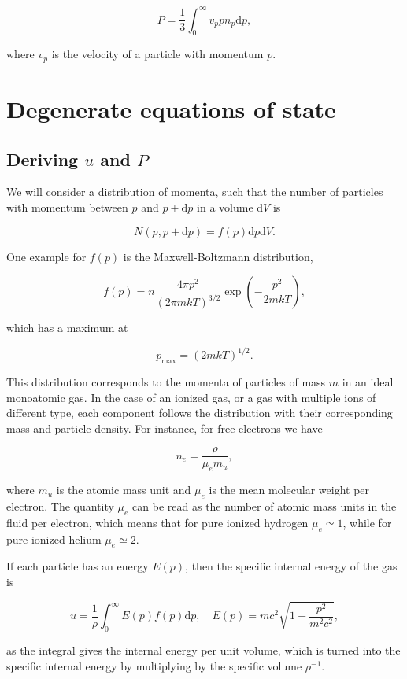 \documentclass[twocolumn]{article}
\begin{document}
\[P=\frac{1}{3}\int_0^\infty v_p p n_p\mathrm{d}p,\]

where \(v_p\) is the velocity of a particle with momentum \(p\).

\hypertarget{degenerate-equations-of-state}{%
\section{Degenerate equations of
state}\label{degenerate-equations-of-state}}

\hypertarget{deriving-u-and-p}{%
\subsection{\texorpdfstring{Deriving \(u\) and
\(P\)}{Deriving u and P}}\label{deriving-u-and-p}}

We will consider a distribution of momenta, such that the number of
particles with momentum between \(p\) and \(p+\mathrm{d}p\) in a volume
\(\mathrm{d}V\) is

\[N(p,p+\mathrm{d}p)=f(p)\mathrm{d}p\mathrm{d}V.\]

One example for \(f(p)\) is the Maxwell-Boltzmann distribution,

\[f(p)=\displaystyle n\frac{4\pi p^2}{(2\pi m k T)^{3/2}}\exp\left(-\frac{p^2}{2m k T}\right),\]

which has a maximum at

\[p_\mathrm{max}=(2m k T)^{1/2}.\]

This distribution corresponds to the momenta of particles of mass \(m\)
in an ideal monoatomic gas. In the case of an ionized gas, or a gas with
multiple ions of different type, each component follows the distribution
with their corresponding mass and particle density. For instance, for
free electrons we have

\[n_e = \displaystyle\frac{\rho}{\mu_e m_u},\]

where \(m_u\) is the atomic mass unit and \(\mu_e\) is the mean
molecular weight per electron. The quantity \(\mu_e\) can be read as the
number of atomic mass units in the fluid per electron, which means that
for pure ionized hydrogen \(\mu_e\simeq1\), while for pure ionized
helium \(\mu_e\simeq2\).

If each particle has an energy \(E(p)\), then the specific internal
energy of the gas is

\[u = \frac{1}{\rho}\int_0^\infty E(p)f(p)\mathrm{d}p,\quad E(p)=mc^2\sqrt{\displaystyle 1+\frac{p^2}{m^2c^2}},\]

as the integral gives the internal energy per unit volume, which is
turned into the specific internal energy by multiplying by the specific
volume \(\rho^{-1}\).
\end{document}
